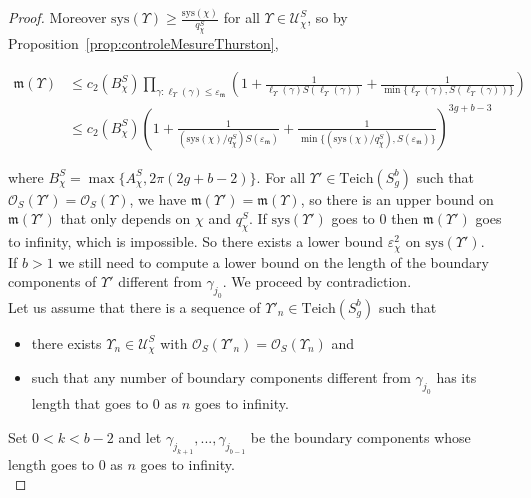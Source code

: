 \documentclass[a4paper,12pt]{article}
\theoremstyle{definition}
\theoremstyle{remark}
\begin{document}
\begin{proof}
    Moreover $\mathrm{sys}(\Upsilon) \geqslant \frac{\mathrm{sys}(\chi)}{q_\chi^S}$ for all $\Upsilon \in \mathcal{U}_\chi^S$, so by Proposition~\ref{prop:controleMesureThurston}, 
    
    \begin{align*}
        \mathfrak{m}(\Upsilon) & \leqslant c_2(B_\chi^S) \prod_{\gamma : \ell_\Upsilon(\gamma)\leqslant \varepsilon_{\mathfrak{m}}} \left( 1 + \frac{1}{\ell_\Upsilon(\gamma)S(\ell_\Upsilon(\gamma))} + \frac{1}{\min\{\ell_\Upsilon(\gamma),S(\ell_\Upsilon(\gamma))\}} \right) \\
        & \leqslant c_2(B_\chi^S)  \left( 1 + \frac{1}{\left(\mathrm{sys}(\chi)/q_\chi^S\right) S(\varepsilon_{\mathfrak{m}})} + \frac{1}{\min\{\left(\mathrm{sys}(\chi)/q_\chi^S\right),S(\varepsilon_{\mathfrak{m}})\}} \right)^{3g+b-3}
    \end{align*}
    
    where $B_\chi^S=\max\{A_\chi^S, 2\pi(2g+b-2)\}$. For all $\Upsilon' \in \mathrm{Teich}(S_g^b)$ such that \\
    $\mathcal{O}_S(\Upsilon')=\mathcal{O}_S(\Upsilon)$, we have $\mathfrak{m}(\Upsilon')=\mathfrak{m}(\Upsilon)$, so there is an upper bound on $\mathfrak{m}(\Upsilon')$ that only depends on $\chi$ and $q_\chi^S$. If $\mathrm{sys}(\Upsilon')$ goes to $0$ then $\mathfrak{m}(\Upsilon')$ goes to infinity, which is impossible. So there exists a lower bound $\varepsilon_\chi^2$ on $\mathrm{sys}(\Upsilon')$.\\ 
    
    
    If $b>1$ we still need to compute a lower bound on the length of the boundary components of $\Upsilon'$ different from $\gamma_{j_0}$. We proceed by contradiction. \\
    
    Let us assume that there is a sequence of $\Upsilon'_n \in \mathrm{Teich}(S_g^b)$ such that 
    \begin{itemize}
        \item there exists $\Upsilon_n \in \mathcal{U}_\chi^S$ with $\mathcal{O}_S(\Upsilon'_n)=\mathcal{O}_S(\Upsilon_n)$ and\\
        \item such that any number of boundary components different from $\gamma_{j_0}$ has its length that goes to $0$ as $n$ goes to infinity.
    \end{itemize}
    Set $0<k<b-2$ and let $\gamma_{j_{k+1}},...,\gamma_{j_{b-1}}$ be the boundary components whose length goes to $0$ as $n$ goes to infinity. \\
    

\end{proof}
\end{document}
